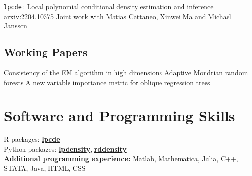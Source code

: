 \documentclass[10pt,a4paper,roman]{moderncv}        %
\begin{document}
\cventry{}
{\vspace{-0.4cm}}
{\texttt{lpcde:} Local polynomial conditional density estimation and inference}
{\color{blue}\href{https://arxiv.org/abs/2204.10375}{arxiv:2204.10375}\color{black}}{}
{Joint work with \color{blue}\href{https://cattaneo.princeton.edu}{Matias Cattaneo}\color{black},
  \color{blue}\href{https://sites.google.com/view/xinweima/home?authuser=0}{Xinwei
    Ma }\color{black}
  and
  \color{blue}\href{https://sites.google.com/berkeley.edu/michael-jansson/}{Michael
    Jansson}\color{black}
  }
\subsection{Working Papers}
{Consistency of the EM algorithm in high dimensions} {}{}{}
{Adaptive Mondrian random forests} {}{}{}
{A new variable importance metric for oblique regression trees} {}{}{}

\vspace{-0.3cm}
\section{Software and Programming Skills}
R packages:
\color{blue}\href{https://nppackages.github.io/lpcde/}{\textbf{lpcde}}\color{black}
\\
Python packages: \color{blue}\href{https://nppackages.github.io/lpdensity_doc/}
{\textbf{lpdensity}}\color{black},
\color{blue}\href{https://rdpackages.github.io/rddensity_doc/}
{\textbf{rddensity}}\color{black}
\\
\textbf{Additional programming experience:}
Matlab, Mathematica, Julia, C++, STATA, Java, HTML, CSS
\end{document}
